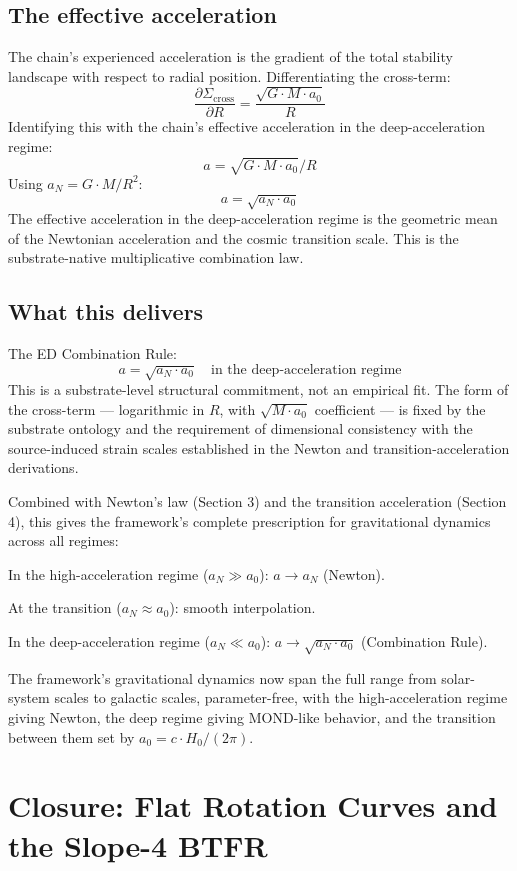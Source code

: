 \documentclass[11pt,a4paper]{article}
\begin{document}
\subsection{The effective acceleration}

The chain's experienced acceleration is the gradient of the total stability landscape with respect to radial position. Differentiating the cross-term:
\[
\frac{\partial \Sigma_{\mathrm{cross}}}{\partial R} = \frac{\sqrt{G \cdot M \cdot a_{0}}}{R}
\]
Identifying this with the chain's effective acceleration in the deep-acceleration regime:
\[
a = \sqrt{G \cdot M \cdot a_{0}} / R
\]
Using $a_N = G\cdot M/R^2$:
\[
a = \sqrt{a_N \cdot a_{0}}
\]
The effective acceleration in the deep-acceleration regime is the geometric mean of the Newtonian acceleration and the cosmic transition scale. This is the substrate-native multiplicative combination law.

\subsection{What this delivers}

The ED Combination Rule:
\[
a = \sqrt{a_N \cdot a_{0}} \quad \text{in the deep-acceleration regime}
\]
This is a substrate-level structural commitment, not an empirical fit. The form of the cross-term --- logarithmic in $R$, with $\sqrt{M\cdot a_0}$ coefficient --- is fixed by the substrate ontology and the requirement of dimensional consistency with the source-induced strain scales established in the Newton and transition-acceleration derivations.

Combined with Newton's law (Section 3) and the transition acceleration (Section 4), this gives the framework's complete prescription for gravitational dynamics across all regimes:

In the high-acceleration regime ($a_N \gg a_0$): $a \to a_N$ (Newton).

At the transition ($a_N \approx a_0$): smooth interpolation.

In the deep-acceleration regime ($a_N \ll a_0$): $a \to \sqrt{a_N \cdot a_0}$ (Combination Rule).

The framework's gravitational dynamics now span the full range from solar-system scales to galactic scales, parameter-free, with the high-acceleration regime giving Newton, the deep regime giving MOND-like behavior, and the transition between them set by $a_0 = c\cdot H_0/(2\pi)$.

\section{Closure: Flat Rotation Curves and the Slope-4 BTFR}
\end{document}
